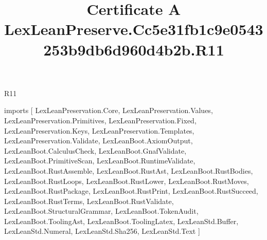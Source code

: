 \begin{lexlean}{R11}
\title{Certificate A LexLeanPreserve.Cc5e31fb1c9e0543253b9db6d960d4b2b.R11}
\begin{coremodule}
imports [
  LexLeanPreservation.Core,
  LexLeanPreservation.Values,
  LexLeanPreservation.Primitives,
  LexLeanPreservation.Fixed,
  LexLeanPreservation.Keys,
  LexLeanPreservation.Templates,
  LexLeanPreservation.Validate,
  LexLeanBoot.AxiomOutput,
  LexLeanBoot.CalculusCheck,
  LexLeanBoot.GnafValidate,
  LexLeanBoot.PrimitiveScan,
  LexLeanBoot.RuntimeValidate,
  LexLeanBoot.RustAssemble,
  LexLeanBoot.RustAst,
  LexLeanBoot.RustBodies,
  LexLeanBoot.RustLoops,
  LexLeanBoot.RustLower,
  LexLeanBoot.RustMoves,
  LexLeanBoot.RustPackage,
  LexLeanBoot.RustPrint,
  LexLeanBoot.RustSucceed,
  LexLeanBoot.RustTerms,
  LexLeanBoot.RustValidate,
  LexLeanBoot.StructuralGrammar,
  LexLeanBoot.TokenAudit,
  LexLeanBoot.ToolingAst,
  LexLeanBoot.ToolingLatex,
  LexLeanStd.Buffer,
  LexLeanStd.Numeral,
  LexLeanStd.Sha256,
  LexLeanStd.Text
]


\end{coremodule}
\end{lexlean}
